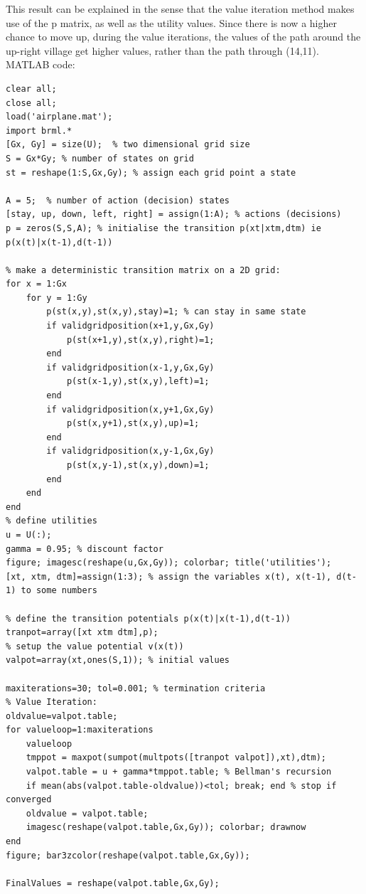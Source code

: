 \documentclass[11pt,a4paper,oneside]{report}
\begin{document}
     This result can be explained in the sense that the value iteration method makes use of the p matrix, as well as the utility values. Since there is now a higher chance to move up, during the value iterations, the values of the path around the up-right village get higher values, rather than the path through (14,11).\\
     
     MATLAB code:
     

\begin{lstlisting}
clear all;
close all;
load('airplane.mat');
import brml.*
[Gx, Gy] = size(U);  % two dimensional grid size
S = Gx*Gy; % number of states on grid
st = reshape(1:S,Gx,Gy); % assign each grid point a state

A = 5;  % number of action (decision) states
[stay, up, down, left, right] = assign(1:A); % actions (decisions)
p = zeros(S,S,A); % initialise the transition p(xt|xtm,dtm) ie p(x(t)|x(t-1),d(t-1))

% make a deterministic transition matrix on a 2D grid:
for x = 1:Gx
	for y = 1:Gy
		p(st(x,y),st(x,y),stay)=1; % can stay in same state
		if validgridposition(x+1,y,Gx,Gy)
			p(st(x+1,y),st(x,y),right)=1;
		end
		if validgridposition(x-1,y,Gx,Gy)
			p(st(x-1,y),st(x,y),left)=1;
		end
		if validgridposition(x,y+1,Gx,Gy)
			p(st(x,y+1),st(x,y),up)=1;
		end
		if validgridposition(x,y-1,Gx,Gy)
			p(st(x,y-1),st(x,y),down)=1;
		end
	end
end
% define utilities
u = U(:);
gamma = 0.95; % discount factor
figure; imagesc(reshape(u,Gx,Gy)); colorbar; title('utilities');
[xt, xtm, dtm]=assign(1:3); % assign the variables x(t), x(t-1), d(t-1) to some numbers

% define the transition potentials p(x(t)|x(t-1),d(t-1))
tranpot=array([xt xtm dtm],p);
% setup the value potential v(x(t))
valpot=array(xt,ones(S,1)); % initial values

maxiterations=30; tol=0.001; % termination criteria
% Value Iteration:
oldvalue=valpot.table;
for valueloop=1:maxiterations
	valueloop
	tmppot = maxpot(sumpot(multpots([tranpot valpot]),xt),dtm);
	valpot.table = u + gamma*tmppot.table; % Bellman's recursion
	if mean(abs(valpot.table-oldvalue))<tol; break; end % stop if converged
	oldvalue = valpot.table;
	imagesc(reshape(valpot.table,Gx,Gy)); colorbar; drawnow
end
figure; bar3zcolor(reshape(valpot.table,Gx,Gy));

FinalValues = reshape(valpot.table,Gx,Gy);


\end{lstlisting}
\end{document}
